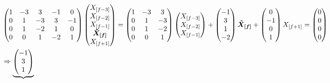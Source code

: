 \begin{equation}
\hspace{-3.5cm}
\begin{split}
&\begin{pmatrix}
1 &-3 &3 &-1&0\\
0 &1 &-3 &3 &-1\\
0 &1 &-2 &1 &0\\
0 &0 &1 &-2 &1\\
\end{pmatrix}
\begin{pmatrix}
X_{[f-3]}\\
X_{[f-2]}\\
X_{[f-1]}\\
\boldsymbol{\tilde{X}_{[f]}}\\
X_{[f+1]}\\
\end{pmatrix} = 
\begin{pmatrix}
1 &-3 &3\\
0 &1 &-3\\
0 &1 &-2\\
0 &0 &1\\
\end{pmatrix}
\begin{pmatrix}
X_{[f-3]}\\
X_{[f-2]}\\
X_{[f-1]}\\
\end{pmatrix}+
\begin{pmatrix}
-1\\
3\\
1\\
-2\\
\end{pmatrix}
\boldsymbol{\tilde{X}_{[f]}}+
\begin{pmatrix}
0\\
-1\\
0\\
1\\
\end{pmatrix}
X_{[f+1]} = 
\begin{pmatrix}
0\\
0\\
0\\
0\\
\end{pmatrix} \\
&\Rightarrow
\underbrace{
\begin{pmatrix}
-1\\
3\\
1\\

\end{pmatrix}}
\end{split}
\end{equation}
